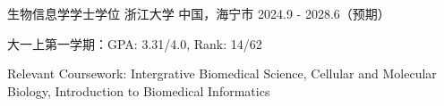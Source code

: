 

\begin{cventries}

  \cventry
    {生物信息学学士学位} %
    {浙江大学} %
    {中国，海宁市} %
    {2024.9 - 2028.6（预期）} %
    {
      \begin{cvitems} %
        \item {大一上第一学期：GPA: 3.31/4.0, Rank: 14/62 }
        \item {Relevant Coursework: Intergrative Biomedical Science, Cellular and Molecular Biology, Introduction to Biomedical Informatics}
      \end{cvitems}
    }

\end{cventries}
